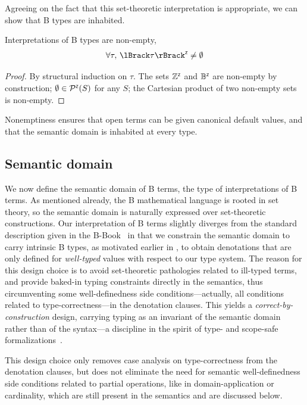 Agreeing on the fact that this set-theoretic interpretation is appropriate, we can show
that B types are inhabited.

\begin{lemma}
  \label{thm:b-type-nonempty}
  Interpretations of B types are non-empty, \ie
  \[\forall \tau,\, \interpZ{\tau} \neq \emptyset\]
\end{lemma}
\begin{proof}
  By structural induction on \(\tau\).
  The sets \(\mathbb{Z}^{\scriptscriptstyle{\mathsf{Z}}}\) and \(\mathbb{B}^{\scriptscriptstyle{\mathsf{Z}}}\) are non-empty by construction;
  \(\emptyset \in \mathop{\mathcal{P}^{\scriptscriptstyle{\mathsf{Z}}}}(S)\) for any \(S\);
  the Cartesian product of two non-empty sets is non-empty.
\end{proof}

Nonemptiness ensures that open terms can be given canonical default values, and
that the semantic domain is inhabited at every type.

\subsection{Semantic domain}
\label{subsec:b-sem-domain}

We now define the semantic domain of B terms, \ie the type of interpretations of B terms.
As mentioned already, the B mathematical language is rooted in set theory, so the semantic domain
is naturally expressed over set-theoretic constructions.
Our interpretation of B terms slightly diverges from the standard description given in the
B-Book~\cite{abrial1996bbook} in that we constrain the semantic domain to carry intrinsic B types,
as motivated earlier in , to obtain denotations that are only
defined for \emph{well-typed} values with respect to our type system.
The reason for this design choice is to avoid set-theoretic pathologies related to ill-typed terms,
and provide baked-in typing constraints directly in the semantics, thus circumventing some
well-definedness side conditions---actually, all conditions related to type-correctness---in the
denotation clauses.
This yields a \emph{correct-by-construction} design, carrying typing as an invariant of the semantic domain rather than of the syntax---a discipline in the spirit of type- and scope-safe formalizations~\cite{allais2018syntaxes}.

\begin{remark}
  \label{rem:b-typecorrectness-only}
  This design choice only removes case analysis on type-correctness from the denotation clauses, but does not eliminate the need for semantic well-definedness side conditions related to partial operations, like in domain-application or cardinality, which are still present in the semantics and are discussed below.
\end{remark}

